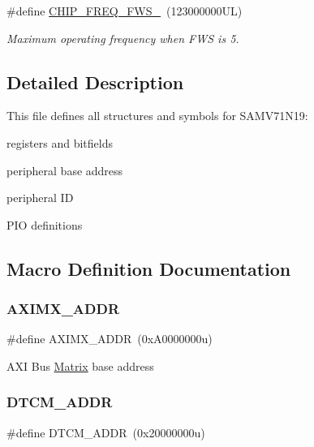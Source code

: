 \begin{DoxyCompactItemize}
\mbox{\label{group__SAMV71N19__definitions_ga3b66824f858591135877b369f98d48a5}} 
\#define \mbox{\hyperlink{group__SAMV71N19__definitions_ga3b66824f858591135877b369f98d48a5}{C\+H\+I\+P\+\_\+\+F\+R\+E\+Q\+\_\+\+F\+W\+S\+\_}}~(123000000\+U\+L)
\begin{DoxyCompactList}\small\item\em Maximum operating frequency when F\+WS is 5. \end{DoxyCompactList}\end{DoxyCompactItemize}


\subsection{Detailed Description}
This file defines all structures and symbols for S\+A\+M\+V71\+N19\+:
\begin{DoxyItemize}
\item registers and bitfields
\item peripheral base address
\item peripheral ID
\item P\+IO definitions 
\end{DoxyItemize}

\subsection{Macro Definition Documentation}
\mbox{\label{group__SAMV71N19__definitions_ga2fb7cc681bf5e7fbce5e3635b72a330a}} 
\subsubsection{\texorpdfstring{AXIMX\_ADDR}{AXIMX\_ADDR}}
{\footnotesize\ttfamily \#define A\+X\+I\+M\+X\+\_\+\+A\+D\+DR~(0x\+A0000000u)}

A\+XI Bus \mbox{\hyperlink{structMatrix}{Matrix}} base address \mbox{\label{group__SAMV71N19__definitions_ga26626a425f7ebb3a0c2dbc276f0d9f78}} 
\subsubsection{\texorpdfstring{DTCM\_ADDR}{DTCM\_ADDR}}
{\footnotesize\ttfamily \#define D\+T\+C\+M\+\_\+\+A\+D\+DR~(0x20000000u)}

